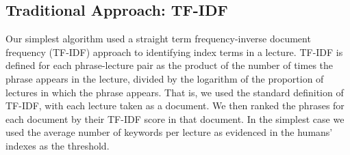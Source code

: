 \subsection{Traditional Approach: TF-IDF}
\label{sec:tfidf}


Our simplest algorithm used a straight term frequency-inverse document
frequency (TF-IDF) approach to identifying index terms in a
lecture. TF-IDF is defined for each phrase-lecture pair as the product
of the number of times the phrase appears in the lecture, divided by
the logarithm of the proportion of lectures in which the phrase
appears. That is, we used the standard definition of TF-IDF, with each
lecture taken as a document. We then ranked the phrases for each
document by their TF-IDF score in that document. In the simplest case
we used the average number of keywords per lecture as evidenced in the
humans' indexes as the threshold.



